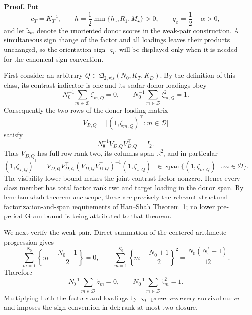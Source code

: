 \textbf{Proof.}
Put
\[
 c_T=K_T^{-1},
 \qquad
 \bar h=\frac12\min\{h_\circ,R_1,M_\star\}>0,
 \qquad
 q_\alpha=\frac12-\alpha>0,
 \tag{1}
\]
and let \(\widetilde z_m\) denote the unoriented donor scores in the weak-pair construction.  A simultaneous sign change of the factor and all loadings leaves their products unchanged, so the orientation sign \(\varsigma_T\) will be displayed only when it is needed for the canonical sign convention.

First consider an arbitrary \(Q\in\mathfrak Q_{2,\mathrm{vis}}(N_0,K_T,K_D)\).  By the definition of this class, its contrast indicator is one and its scalar donor loadings obey
\[
 N_0^{-1}\sum_{m\in\mathcal D}\zeta_{m,Q}=0,
 \qquad
 N_0^{-1}\sum_{m\in\mathcal D}\zeta_{m,Q}^2=1.
 \tag{2}
\]
Consequently the two rows of the donor loading matrix
\[
 V_{D,Q}=\bigl[(1,\zeta_{m,Q})^\top:m\in\mathcal D\bigr]
\]
satisfy
\[
 N_0^{-1}V_{D,Q}V_{D,Q}^\top=I_2.
 \tag{3}
\]
Thus \(V_{D,Q}\) has full row rank two, its columns span \(\mathbb R^2\), and in particular
\[
 (1,\zeta_{\star,Q})^\top
 =V_{D,Q}V_{D,Q}^\top
   (V_{D,Q}V_{D,Q}^\top)^{-1}(1,\zeta_{\star,Q})^\top
 \in\operatorname{span}\{(1,\zeta_{m,Q})^\top:m\in\mathcal D\}.
 \tag{4}
\]
The visibility lower bound makes the joint contrast factor nonzero.  Hence every class member has total factor rank two and target loading in the donor span.  By \(\mathrm{lem:han\mbox{-}shah\mbox{-}theorem\mbox{-}one\mbox{-}scope}\), these are precisely the relevant structural factorization-and-span requirements of Han--Shah Theorem~1; no lower pre-period Gram bound is being attributed to that theorem.

We next verify the weak pair.  Direct summation of the centered arithmetic progression gives
\[
 \sum_{m=1}^{N_0}\left\{m-\frac{N_0+1}{2}\right\}=0,
 \qquad
 \sum_{m=1}^{N_0}\left\{m-\frac{N_0+1}{2}\right\}^2
 =\frac{N_0(N_0^2-1)}{12}.
\]
Therefore
\[
 N_0^{-1}\sum_{m\in\mathcal D}\widetilde z_m=0,
 \qquad
 N_0^{-1}\sum_{m\in\mathcal D}\widetilde z_m^2=1.
 \tag{5}
\]
Multiplying both the factors and loadings by \(\varsigma_T\) preserves every survival curve and imposes the sign convention in \(\mathrm{def:rank\mbox{-}at\mbox{-}most\mbox{-}two\mbox{-}closure}\).

